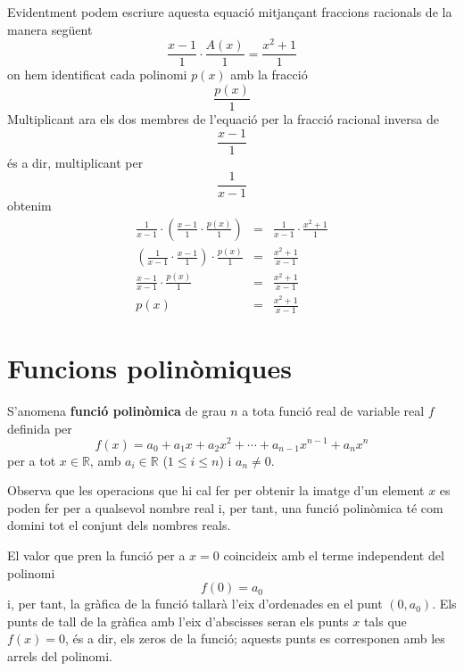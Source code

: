 Evidentment podem escriure aquesta equació mitjançant fraccions
racionals de la manera següent\begin{equation*}
\frac{x-1}{1}\cdot \frac{A(x)}{1}=\frac{x^{2}+1}{1}
\end{equation*}on hem identificat cada polinomi $p(x)$ amb la fracció\begin{equation*}
\frac{p(x)}{1}
\end{equation*}Multiplicant ara els dos membres de l'equació per la fracció
racional inversa de
\begin{equation*}
\frac{x-1}{1}
\end{equation*}és a dir, multiplicant per\begin{equation*}
\frac{1}{x-1}
\end{equation*}obtenim\begin{eqnarray*}
\frac{1}{x-1}\cdot \left( \frac{x-1}{1}\cdot \frac{p(x)}{1}\right) &=&\frac{1}{x-1}\cdot \frac{x^{2}+1}{1} \\
\left( \frac{1}{x-1}\cdot \frac{x-1}{1}\right) \cdot \frac{p(x)}{1} &=&\frac{x^{2}+1}{x-1} \\
\frac{x-1}{x-1}\cdot \frac{p(x)}{1} &=&\frac{x^{2}+1}{x-1} \\
p(x) &=&\frac{x^{2}+1}{x-1}
\end{eqnarray*}

\section{Funcions polinòmiques}

S'anomena \textbf{funció polinòmica} de grau $n$ a tota funció
real de variable real $f$ definida per\begin{equation*}
f(x)=a_{0}+a_{1}x+a_{2}x^{2}+\cdots +a_{n-1}x^{n-1}+a_{n}x^{n}
\end{equation*}per a tot $x\in \mathbb{R}$, amb $a_{i}\in \mathbb{R}$ ($1\leq i\leq n$) i $a_{n}\neq 0$.

Observa que les operacions que hi cal fer per obtenir la imatge d'un
element $x$ es poden fer per a qualsevol nombre real i, per tant, una
funció polinòmica té com domini tot el conjunt dels nombres reals.

El valor que pren la funció per a $x=0$ coincideix amb el terme
independent del polinomi\begin{equation*}
f(0)=a_{0}
\end{equation*}i, per tant, la gràfica de la funció tallarà l'eix
d'ordenades en el punt $(0,a_{0})$. Els punts de tall de la gràfica amb
l'eix d'abscisses seran els punts $x$ tals que $f(x)=0$, és a dir,
els zeros de la funció; aquests punts es corresponen amb les arrels del polinomi.

